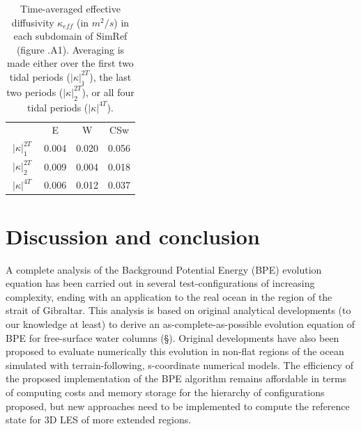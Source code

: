 \begin{table}[h]
    \centering
    \begin{tabular}{|c|c|c|c|}
          \hline
         & E & W & CSw \\
         \cline{2-4}
         $\: |\kappa|^{2T}_1\;$ & 0.004 & 0.020 & 0.056\\
         $\: |\kappa|^{2T}_2 \;$ & 0.009 & 0.004 & 0.018\\
         $\: |\kappa|^{4T} \;$ & 0.006 & 0.012 & 0.037\\
         \hline
    \end{tabular}
    \caption[Time-averaged effective diffusivity $\kappa_{eff}$ in SimRef.]{Time-averaged effective diffusivity $\kappa_{eff}$ (in $m^2/s$) in each subdomain of SimRef (figure .A1). Averaging is made either over the first two tidal periods ($|\kappa |^{2T}_1$), the last two periods ($|\kappa |^{2T}_2$), or all four tidal periods ($|\kappa |^{4T}$).}
    \label{tab_kappaTCS}
\end{table}

\section{Discussion and conclusion}
A complete analysis of the Background Potential Energy (BPE) evolution equation has been carried out in several test-configurations of increasing complexity, ending with an application to the real ocean in the region of the strait of Gibraltar. This analysis is based on original analytical developments (to our knowledge at least) to derive an as-complete-as-possible evolution equation of BPE for free-surface water columns (\S {}). Original developments have also been proposed to evaluate numerically this evolution in non-flat regions of the ocean simulated with terrain-following, s-coordinate numerical models. The efficiency of the proposed implementation of the BPE algorithm remains affordable in terms of computing costs and memory storage for the hierarchy of configurations proposed, but new approaches need to be implemented to compute the reference state \citep{saenz_estimating_2015} for 3D LES of more extended regions.



